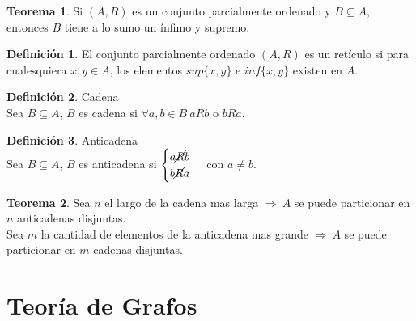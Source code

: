 \documentclass[10pt]{article}
\theoremstyle{definition}
\newtheorem{definition}{Definición}[section]
\newtheorem{theorem}{Teorema}[section]
\begin{document}
\begin{theorem}
	Si $(A,R)$ es un conjunto parcialmente ordenado y $B\subseteq A$, entonces $B$ tiene a lo sumo un ínfimo y supremo.
\end{theorem}
\begin{definition}
	El conjunto parcialmente ordenado $(A,R)$ es un retículo si para cualesquiera $x,y\in A$, los elementos $sup\{x,y\}$ e $inf\{x,y\}$ existen en $A$.
\end{definition}
\begin{definition}{Cadena}
	\\Sea $B\subseteq A$, $B$ es cadena si $\forall a,b\in B\ aRb$ o $bRa$.
\end{definition}
\begin{definition}{Anticadena}
	\\Sea $B\subseteq A$, $B$ es anticadena si $\begin{cases} a\cancel{R}b\\b\cancel{R}a\end{cases}$ con $a\neq b$.
\end{definition}
\begin{theorem}
	Sea $n$ el largo de la cadena mas larga $\Rightarrow\ A$ se puede particionar en $n$ anticadenas disjuntas.\\
	Sea $m$ la cantidad de elementos de la anticadena mas grande $\Rightarrow\ A$ se puede particionar en $m$ cadenas disjuntas.
\end{theorem}
\newpage\section{Teoría de Grafos}
\end{document}
